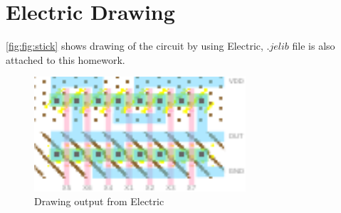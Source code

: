 \documentclass[a4paper,10pt]{article}
\begin{document}
\section{Electric Drawing}
\autoref{fig:fig:stick} shows drawing of the circuit by using Electric, $.jelib$ file is also attached to this homework.
\begin{figure}[ht!]
\centering
 \includegraphics[width=0.7\textwidth]{7_input_function.pdf}
 \caption{Drawing output from Electric}
\label{fig:fig:stick}

\end{figure}
\end{document}
